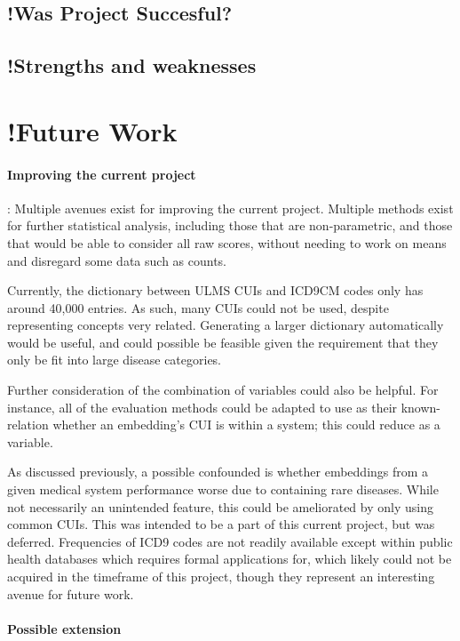 \documentclass[10pt]{article}
\begin{document}
\subsection{!Was Project Succesful?}
\subsection{!Strengths and weaknesses}

\section{!Future Work}
\paragraph{Improving the current project}: Multiple avenues exist for improving the current project. Multiple methods exist for further statistical analysis, including those that are non-parametric, and those that would be able to consider all raw scores, without needing to work on means and disregard some data such as counts. 

Currently, the dictionary between ULMS CUIs and ICD9CM codes only has around 40,000 entries. As such, many CUIs could not be used, despite representing concepts very related. Generating a larger dictionary automatically would be useful, and could possible be feasible given the requirement that they only be fit into large disease categories. 

Further consideration of the combination of variables could also be helpful. For instance, all of the evaluation methods could be adapted to use as their known-relation whether an embedding's CUI is within a system; this could reduce as a variable. 

As discussed previously, a possible confounded is whether embeddings from a given medical system performance worse due to containing rare diseases. While not necessarily an unintended feature, this could be ameliorated by only using common CUIs. This was intended to be a part of this current project, but was deferred. Frequencies of ICD9 codes are not readily available except within public health databases which requires formal applications for, which likely could not be acquired in the timeframe of this project, though they represent an interesting avenue for future work. 
 
\paragraph{Possible extension}
\end{document}
